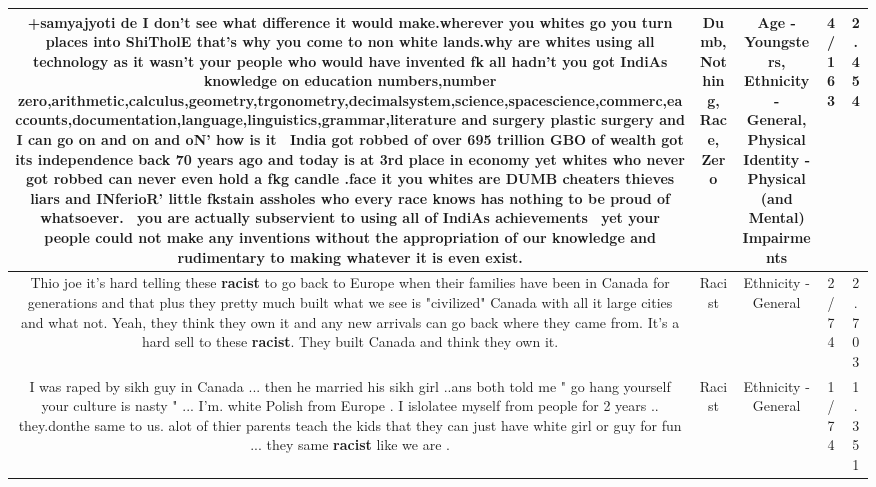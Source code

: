 \documentclass[11pt]{article}
\newlength\mylength
\begin{document}
\begin{center}
\begin{longtable}{|C{.65\mylength}|C{.30\mylength}|C{.12\mylength}|C{.12\mylength}|C{.12\mylength}|}
  \small +samyajyoti de I don't see what difference it would make.wherever you whites go you turn places into ShiTholE that's why you come to non white lands.why are whites using all technology as it wasn't your people who would have invented fk all hadn't you got IndiAs knowledge on education numbers,number \textbf{zero},arithmetic,calculus,geometry,trgonometry,decimalsystem,science,spacescience,commerc,eaccounts,documentation,language,linguistics,grammar,literature and surgery plastic surgery and I can go on and on and oN' how is it  India got robbed of over 695 trillion GBO of wealth got its independence back 70 years ago and today is at 3rd place in economy yet whites who never got robbed can never even hold a fkg candle .face it you whites are \textbf{DUMB} cheaters thieves liars and INferioR' little fkstain assholes who every \textbf{race} knows has \textbf{nothing} to be proud of whatsoever.  you are actually subservient to using all of IndiAs achievements  yet your people could not make any inventions without the appropriation of our knowledge and rudimentary to making whatever it is even exist.\normalsize   & Dumb, Nothing, Race, Zero & Age - Youngsters, Ethnicity - General, Physical Identity - Physical (and Mental) Impairments & 4/163 & 2.454 \\  \hline
  \small Thio joe it's hard telling these \textbf{racist} to go back to Europe when their families have been in Canada for generations and that plus they pretty much built what we see is "civilized" Canada with all it large cities and what not. Yeah, they think they own it and any new arrivals can go back where they came from. It's a hard sell to these \textbf{racist}. They built Canada and think they own it.\normalsize   & Racist & Ethnicity - General & 2/74 & 2.703 \\  \hline
  \small I was raped by sikh guy in Canada ... then he married his sikh girl ..ans both told me " go hang yourself your culture is nasty "  ... I'm. white Polish from Europe . I islolatee myself from people for 2 years .. they.donthe same to us. alot of thier parents teach the kids that they can just have white girl or guy for fun ... they same \textbf{racist} like we are .\normalsize   & Racist & Ethnicity - General & 1/74 & 1.351 \\  \hline

\end{longtable}
\end{center}
\end{document}
